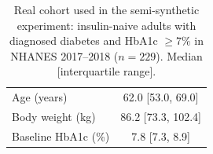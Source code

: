 \begin{table}[tb]
\centering
\caption{Real cohort used in the semi-synthetic experiment: insulin-naive adults with diagnosed diabetes and HbA1c $\ge 7\%$ in NHANES 2017--2018 ($n=229$). Median [interquartile range].}
\label{tab:nhanes_cohort}
\small
\begin{tabular}{lc}
\hline
Age (years) & 62.0 [53.0, 69.0] \\
Body weight (kg) & 86.2 [73.3, 102.4] \\
Baseline HbA1c (\%) & 7.8 [7.3, 8.9] \\
\hline
\end{tabular}
\end{table}
